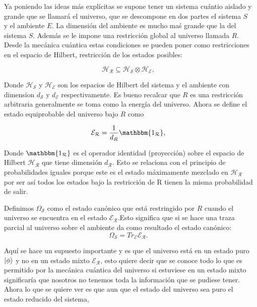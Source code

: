Ya poniendo las ideas más explícitas se supone tener un sistema cuántio aislado y grande que se llamará el universo, que se descompone en dos partes el sistema $S$ y el ambiente $E$. La dimensión del ambiente es mucho maś grande que la del sistema $S$. Además se le impone una restricción global al universo llamada $R$. Desde la mecánica cuántica estas condiciones se pueden poner como restricciones en el espacio de Hilbert, restricción de los estados posibles:

\begin{equation}
\mathcal{H_{R}}\subseteq \mathcal{H_{S}}\otimes \mathcal{H_{E}},
\end{equation}

Donde $\mathcal{H_{S}}$ y $\mathcal{H_{E}}$ son los espacios de Hilbert del sistema y el ambiente con dimension $d_{\mathcal{S}}$  y $d_{\mathcal{E}}$ respectivamente. Es bueno recalcar que $R$ es una restricción arbitraria generalmente se toma como la energía del universo.
Ahora se define el estado equiprobable del universo bajo $R$ como

\begin{equation}
\mathcal{E_{R}} = \frac{1}{d_{R}} \mathbbm{1_{\mathcal{R}}},
\end{equation}

Donde $\mathbbm{1_{\mathcal{R}}}$ es el operador identidad (proyección) sobre el espacio de Hilbert  $\mathcal{H_{R}}$  que tiene dimensión $d_{\mathcal{R}}$. Esto se relaciona con el principio de probabilidades iguales porque este es el estado máximamente mezclado en $\mathcal{H_{R}}$ por ser así todos los estados bajo la restricción de R tienen la misma probabilidad de salir.

Definimos $\Omega_{\mathcal{S}}$ como el estado canónico que está restringido por $R$ cuando el universo se encuentra en el estado $\mathcal{E_{R}}$.Esto significa que si se hace una traza parcial al universo sobre el ambiente da como resultado el estado canónico:
\begin{equation}
 \Omega_{\mathcal{S}} =Tr_{\mathcal{E}} \mathcal{E_{R}}.
\end{equation}

Aquí se hace un supuesto importante y es que el universo está en un estado puro $\ket{\phi}$ y no en un estado mixto $\mathcal{E_{R}}$, esto quiere decir que se conoce todo lo que es permitido por la mecánica cuántica del universo si estuviese en un estado mixto significaría que nosotros no tenemos toda la información que se pudiese tener. Ahora lo que se quiere ver es que aun que el estado del universo sea puro el estado reducido del sistema,

